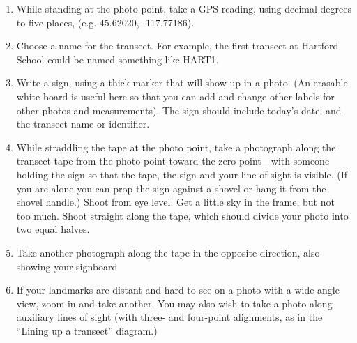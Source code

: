 \documentclass[11pt,letterpaper,twoside,onecolumn]{memoir}
\begin{document}
\begin{enumerate}
\item While standing at the photo point, take a GPS reading, using decimal degrees to five places, (e.g. 45.62020, -117.77186). 

\item Choose a name for the transect. For example, the first transect at Hartford School could be named something like HART1.
\item Write a sign, using a thick marker that will show up in a photo. (An erasable white board is useful here so that you can add and change other labels for other photos and measurements). The sign should include today's date, and the transect name or identifier. 

\item While straddling the tape at the photo point, take a photograph along the transect tape from the photo point toward the zero point---with someone holding the sign so that the tape, the sign and your line of sight is visible. (If you are alone you can prop the sign against a shovel or hang it from the shovel handle.) Shoot from eye level. Get a little sky in the frame, but not too much. Shoot straight along the tape, which should divide your photo into two equal halves.

\item Take another photograph along the tape in the opposite direction, also showing your signboard 
\item If your landmarks are distant and hard to see on a photo with a wide-angle view, zoom in and take another. You may also wish to take a photo along auxiliary lines of sight (with three- and four-point alignments, as in the ``Lining up a transect'' diagram.)



\end{enumerate}
\end{document}
